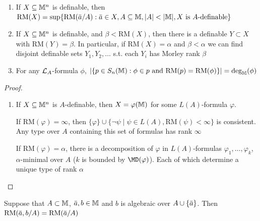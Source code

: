 \documentclass[11pt]{article}
\def \RM {\text{RM}}
\begin{document}
\begin{lemma}[]
\label{Problem11}
\label{lemma6.2.16}
\begin{enumerate}
\item If \(X\subseteq\mathbb{M}^n\) is definable,
then \(\RM(X)=\sup\{\RM(\bara/A):\bara\in X,A\subseteq\M,\abs{A}<\abs{\M},X\text{ is }A\text{-definable}\}\)
\item If \(X\subseteq\mathbb{M}^n\) is definable, and \(\beta<\RM(X)\), then there is a definable \(Y\subset X\)
with \(\RM(Y)=\beta\). In particular, if \(\RM(X)=\alpha\) and \(\beta<\alpha\) we can find disjoint definable
sets \(Y_1,Y_2,\dots\) s.t. each \(Y_i\) has Morley rank \(\beta\)
\item For any \(\mathcal{L}_A\)-formula \(\phi\), \(\abs{\{p\in S_n(\M):\phi\in p\text{ and }\RM(p)=\RM(\phi)\}}=\deg_{\M}(\phi)\)
\end{enumerate}
\end{lemma}


\begin{proof}
\begin{enumerate}
\item If \(X\subseteq\mathbb{M}^n\) is \(A\)-definable, then \(X=\varphi(\mathbb{M})\) for some \(L(A)\)-formula \(\varphi\).

If \(\RM(\varphi)=\infty\), then \(\{\varphi\}\cup\{\neg\psi\mid\psi\in L(A),\RM(\psi)<\infty\}\) is consistent. Any type over \(A\)
containing this set of formulas has rank \(\infty\)

If \(\RM(\varphi)=\alpha\), there is a decomposition of \(\varphi\) in \(L(A)\)-formulas \(\varphi_1,\dots,\varphi_k\), \(\alpha\)-minimal
over \(A\) (\(k\) is bounded by \(\MD(\varphi)\)). Each of which determine a unique type of rank \(\alpha\)
\end{enumerate}
\end{proof}

\begin{lemma}[]
\label{lemma6.2.17}
Suppose that \(A\subset\mathbb{M}\), \(\bara,b\in\M\) and \(b\) is algebraic over \(A\cup\{\bara\}\). Then \(\RM(\bara,b/A)=\RM(\bara/A)\)
\end{lemma}
\end{document}
